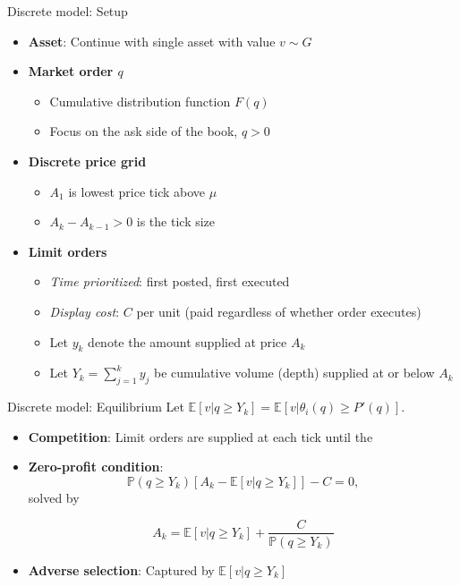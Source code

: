 \documentclass[english,10pt]{beamer}
\begin{document}
\begin{frame}{Discrete model: Setup}
	\begin{itemize}
		\item \textbf{Asset}: Continue with single asset with value $v \sim G$
		\item \textbf{Market order $q$}
		\begin{itemize}
			\item Cumulative distribution function $F(q)$
			\item Focus on the ask side of the book, $q>0$
		\end{itemize}
		\item \textbf{Discrete price grid}
		\begin{itemize}
			\item $A_1$ is lowest price tick above $\mu$
			\item $A_k-A_{k-1}>0$ is the tick size
		\end{itemize}
		\item \textbf{Limit orders}
		\begin{itemize}
			\item \textit{Time prioritized}: first posted, first executed
			\item \textit{Display cost}: $C$ per unit (paid regardless of whether order executes)
			\item Let $y_k$ denote the amount supplied at price $A_k$
			\item Let $Y_k=\sum^k_{j=1} y_j$ be cumulative volume (depth) supplied at or below $A_k$
		\end{itemize}
	\end{itemize}
\end{frame}


\begin{frame}{Discrete model: Equilibrium}
	Let $\mathbb{E}[v|q \geq Y_k]=\mathbb{E}[v|\theta_i(q) \geq P'(q)]$.
	\begin{itemize}
		\item \textbf{Competition}: Limit orders are supplied at each tick until the 
		\item \textbf{Zero-profit condition}:
		\[
		\mathbb{P}(q \geq Y_k)[A_k-\mathbb{E}[v|q \geq Y_k]] - C = 0,
		\]
		solved by
		\begin{block}{}
			\[
			A_k = \mathbb{E}[v| q \geq Y_k] + \frac{C}{\mathbb{P}(q\geq Y_k)}
			\]
		\end{block}
		\item \textbf{Adverse selection}: Captured by  $\mathbb{E}[v| q \geq Y_k] $
	\end{itemize}
\end{frame}
\end{document}
